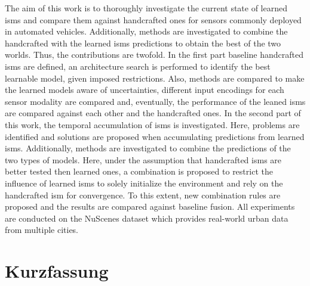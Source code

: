 The aim of this work is to thoroughly investigate the current state of learned \gls{ism}s and compare them against handcrafted ones for sensors commonly deployed in automated vehicles. Additionally, methods are investigated to combine the handcrafted with the learned \gls{ism}s predictions to obtain the best of the two worlds. Thus, the contributions are twofold. In the first part baseline handcrafted \gls{ism}s are defined, an architecture search is performed to identify the best learnable model, given imposed restrictions. Also, methods are compared to make the learned models aware of uncertainties, different input encodings for each sensor modality are compared and, eventually, the performance of the leaned \gls{ism}s are compared against each other and the handcrafted ones. In the second part of this work, the temporal accumulation of \gls{ism}s is investigated. Here, problems are identified and solutions are proposed when accumulating predictions from learned \gls{ism}s. Additionally, methods are investigated to combine the predictions of the two types of models. Here, under the assumption that handcrafted \gls{ism}s are better tested then learned ones, a combination is proposed to restrict the influence of learned \gls{ism}s to solely initialize the environment and rely on the handcrafted \gls{ism} for convergence. To this extent, new combination rules are proposed and the results are compared against baseline fusion. All experiments are conducted on the NuScenes dataset \cite{caesar2020nuscenes} which provides real-world urban data from multiple cities.
%
\section*{Kurzfassung}